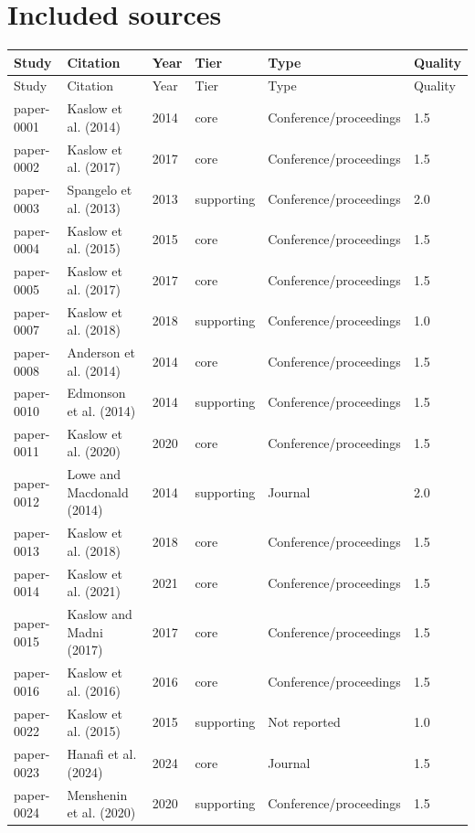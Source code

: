 \documentclass[10pt]{article}
\begin{document}
\section*{Included sources}
\small
\begin{longtable}{p{1.7cm}p{4.0cm}p{1.1cm}p{1.6cm}p{4.0cm}p{1.2cm}}
\toprule
Study & Citation & Year & Tier & Type & Quality\\
\midrule
\endfirsthead
\toprule
Study & Citation & Year & Tier & Type & Quality\\
\midrule
\endhead
paper-0001 & Kaslow et al. (2014) & 2014 & core & Conference/proceedings & 1.5 \\
paper-0002 & Kaslow et al. (2017) & 2017 & core & Conference/proceedings & 1.5 \\
paper-0003 & Spangelo et al. (2013) & 2013 & supporting & Conference/proceedings & 2.0 \\
paper-0004 & Kaslow et al. (2015) & 2015 & core & Conference/proceedings & 1.5 \\
paper-0005 & Kaslow et al. (2017) & 2017 & core & Conference/proceedings & 1.5 \\
paper-0007 & Kaslow et al. (2018) & 2018 & supporting & Conference/proceedings & 1.0 \\
paper-0008 & Anderson et al. (2014) & 2014 & core & Conference/proceedings & 1.5 \\
paper-0010 & Edmonson et al. (2014) & 2014 & supporting & Conference/proceedings & 1.5 \\
paper-0011 & Kaslow et al. (2020) & 2020 & core & Conference/proceedings & 1.5 \\
paper-0012 & Lowe and Macdonald (2014) & 2014 & supporting & Journal & 2.0 \\
paper-0013 & Kaslow et al. (2018) & 2018 & core & Conference/proceedings & 1.5 \\
paper-0014 & Kaslow et al. (2021) & 2021 & core & Conference/proceedings & 1.5 \\
paper-0015 & Kaslow and Madni (2017) & 2017 & core & Conference/proceedings & 1.5 \\
paper-0016 & Kaslow et al. (2016) & 2016 & core & Conference/proceedings & 1.5 \\
paper-0022 & Kaslow et al. (2015) & 2015 & supporting & Not reported & 1.0 \\
paper-0023 & Hanafi et al. (2024) & 2024 & core & Journal & 1.5 \\
paper-0024 & Menshenin et al. (2020) & 2020 & supporting & Conference/proceedings & 1.5 \\

\end{longtable}
\end{document}
